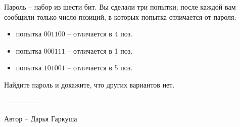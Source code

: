 \question
Пароль -- набор из шести бит. Вы сделали три попытки; после каждой вам сообщили только число позиций, в которых попытка отличается от пароля:
\begin{itemize}
    \item попытка $001100$ -- отличается в 4 поз.
    \item попытка $000111$ -- отличается в 1 поз.
    \item попытка $101001$ -- отличается в 5 поз.
\end{itemize}
Найдите пароль и докажите, что других вариантов нет.

---------------

Автор -- Дарья Гаркуша